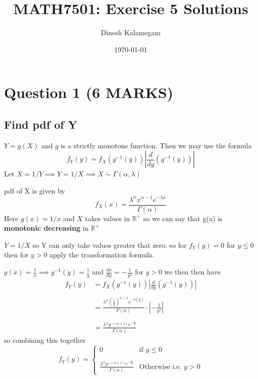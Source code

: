 \documentclass[11pt]{article}
\begin{document}
\title{MATH7501: Exercise 5 Solutions}
\author{Dinesh Kalamegam}
\date{\today}
\maketitle

\renewcommand\qedsymbol{\textbf{\emph{Quod Erat Demonstrandum}}}
\setlength{\parindent}{0pt}
\setlength{\parskip}{\baselineskip}
\newtheorem{theorem}{Theorem}[section]
\newtheorem{definition}[theorem]{Defintion}
\newtheorem{proposition}[theorem]{Proposition}
\newtheorem{corollary}[theorem]{Corollary}

\section{Question 1 (6 MARKS)}
\subsection{Find pdf of Y}
$Y=g(X)$ and $g$ is a strictly monotone function. Then we may use the formula
\begin{equation*}
  f_{Y}(y) =f_{X}(g^{-1}(y))\left\lvert \frac{d}{dy}(g^{-1}(y)) \right\rvert
\end{equation*}
Let $X = 1/Y \implies Y=1/X \implies X \sim \Gamma(\alpha,\lambda)$

pdf of X is given by
\begin{equation*}
  f_{X}(x)= \frac{\lambda^{\alpha}x^{\alpha -1} e^{-\lambda x}}{\Gamma(\alpha)}
\end{equation*}
Here $g(x)= 1/x$ and $X$ takes values in $\mathbb{R}^{+}$ so we can say that g(x) is \textbf{monotonic decreasing} in  $\mathbb{R}^{+}$

$Y=1/X$ so Y can only take values greater that zero. so for $f_{Y}(y)=0$ for $y\leq0$ then for $y>0$ apply the transformation formula.

$g(x)=\frac{1}{x} \implies g^{-1}(y) = \frac{1}{y}$ and $\frac{dx}{dy} = -\frac{1}{y^{2}}$ for $y>0$ we then then have
\begin{align*}
    f_{Y}(y) &=f_{X}(g^{-1}(y))\left\lvert \frac{d}{dy}(g^{-1}(y)) \right\rvert \\ \\
            &= \frac{\lambda^{\alpha}(\frac{1}{y})^{\alpha -1} e^{-\lambda (\frac{1}{y})}}{\Gamma(\alpha)} \cdot \left \lvert -\frac{1}{y^{2}} \right\rvert \\ \\
            &= \frac{\lambda^{\alpha}y^{-(\alpha+1)}e^{-\frac{\lambda}{y}}}{\Gamma(\alpha)}
\end{align*}
so combining this together
\begin{equation*}
  \boxed{
  f_{Y}(y)=
  \begin{cases}
    0 & \text{if $y\leq0$} \\ \\
    \frac{\lambda^{\alpha}y^{-(\alpha+1)}e^{-\frac{\lambda}{y}}}{\Gamma(\alpha)} & \text{Otherwise i.e. $y>0$}
  \end{cases}
  }
\end{equation*}
\end{document}
